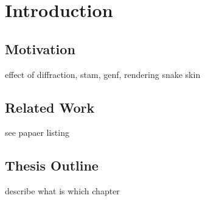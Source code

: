 \section{Introduction}
\subsection{Motivation}
effect of diffraction, stam, genf, rendering snake skin 
\subsection{Related Work}
see papaer listing
\subsection{Thesis Outline}
describe what is which chapter

